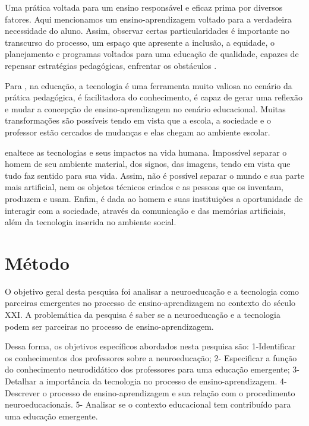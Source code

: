 \documentclass[portuguese]{textolivre}
\begin{document}
Uma prática voltada para um ensino responsável e eficaz prima por diversos fatores. Aqui mencionamos um ensino-aprendizagem voltado para a verdadeira necessidade do aluno. Assim, observar certas particularidades é importante no transcurso do processo, um espaço que apresente a inclusão, a equidade, o planejamento e programas voltados para uma educação de qualidade, capazes de repensar estratégias pedagógicas, enfrentar os obstáculos \cite{sousa_educacao_2020}.

Para \textcite{amorim_as_2019}, na educação, a tecnologia é uma ferramenta muito valiosa no cenário da prática pedagógica, é facilitadora do conhecimento, é capaz de gerar uma reflexão e mudar a concepção de ensino-aprendizagem no cenário educacional. Muitas transformações são possíveis tendo em vista que a escola, a sociedade e o professor estão cercados de mudanças e elas chegam ao ambiente escolar.

\textcite{levy_cibercultura_1999} enaltece as tecnologias e seus impactos na vida humana. Impossível separar o homem de seu ambiente material, dos signos, das imagens, tendo em vista que tudo faz sentido para sua vida. Assim, não é possível separar o mundo e sua parte mais artificial, nem os objetos técnicos criados e as pessoas que os inventam, produzem e usam. Enfim, é dada ao homem e suas instituições a oportunidade de interagir com a sociedade, através da comunicação e das memórias artificiais, além da tecnologia inserida no ambiente social.

\section{Método}\label{sec-organizacao}
O objetivo geral desta pesquisa foi analisar a neuroeducação e a tecnologia como parceiras emergentes no processo de ensino-aprendizagem no contexto do século XXI. A problemática da pesquisa é saber se a neuroeducação e a tecnologia podem ser parceiras no processo de ensino-aprendizagem.

Dessa forma, os objetivos específicos abordados nesta pesquisa são: 1-Identificar os conhecimentos dos professores sobre a neuroeducação; 2- Especificar a função do conhecimento neurodidático dos professores para uma educação emergente; 3- Detalhar a importância da tecnologia no processo de ensino-aprendizagem. 4- Descrever o processo de ensino-aprendizagem e sua relação com o procedimento neuroeducacionais. 5- Analisar se o contexto educacional tem contribuído para uma educação emergente.
\end{document}
